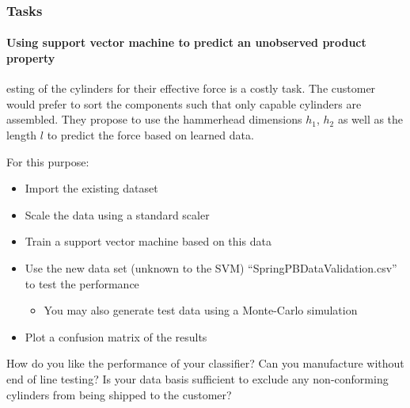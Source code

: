 \begin{frame}
    \frametitle{Tasks}
    \framesubtitle{Using support vector machine to predict an unobserved product property}
    esting of the cylinders for their effective force is a costly task. The customer would prefer to sort the components such that only capable cylinders are assembled. They propose to use the hammerhead dimensions $h_{1}$, $h_{2}$ as well as the length $l$ to predict the force based on learned data.

For this purpose:
\begin{itemize}
	\item Import the existing dataset
	\item Scale the data using a standard scaler
	\item Train a support vector machine based on this data
	\item Use the new data set (unknown to the SVM) ``SpringPBDataValidation.csv'' to test the performance
	\begin{itemize}
		\item You may also generate test data using a Monte-Carlo simulation
	\end{itemize}
	\item Plot a confusion matrix of the results
\end{itemize}

How do you like the performance of your classifier? Can you manufacture without end of line testing? Is your data basis sufficient to exclude any non-conforming cylinders from being shipped to the customer?
\end{frame}